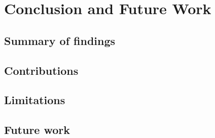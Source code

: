 \chapter{Conclusion and Future Work}
\label{chap:conclusion}

\section{Summary of findings}

\section{Contributions}

\section{Limitations}

\section{Future work}
